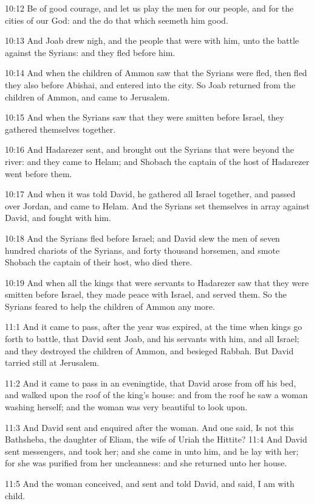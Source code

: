 10:12 Be of good courage, and let us play the men for our people, and
for the cities of our God: and the \LORD do that which seemeth him
good.

10:13 And Joab drew nigh, and the people that were with him, unto the
battle against the Syrians: and they fled before him.

10:14 And when the children of Ammon saw that the Syrians were fled,
then fled they also before Abishai, and entered into the city. So Joab
returned from the children of Ammon, and came to Jerusalem.

10:15 And when the Syrians saw that they were smitten before Israel,
they gathered themselves together.

10:16 And Hadarezer sent, and brought out the Syrians that were beyond
the river: and they came to Helam; and Shobach the captain of the host
of Hadarezer went before them.

10:17 And when it was told David, he gathered all Israel together, and
passed over Jordan, and came to Helam. And the Syrians set themselves
in array against David, and fought with him.

10:18 And the Syrians fled before Israel; and David slew the men of
seven hundred chariots of the Syrians, and forty thousand horsemen,
and smote Shobach the captain of their host, who died there.

10:19 And when all the kings that were servants to Hadarezer saw that
they were smitten before Israel, they made peace with Israel, and
served them. So the Syrians feared to help the children of Ammon any
more.

11:1 And it came to pass, after the year was expired, at the time when
kings go forth to battle, that David sent Joab, and his servants with
him, and all Israel; and they destroyed the children of Ammon, and
besieged Rabbah. But David tarried still at Jerusalem.

11:2 And it came to pass in an eveningtide, that David arose from off
his bed, and walked upon the roof of the king's house: and from the
roof he saw a woman washing herself; and the woman was very beautiful
to look upon.

11:3 And David sent and enquired after the woman. And one said, Is not
this Bathsheba, the daughter of Eliam, the wife of Uriah the Hittite?
11:4 And David sent messengers, and took her; and she came in unto
him, and he lay with her; for she was purified from her uncleanness:
and she returned unto her house.

11:5 And the woman conceived, and sent and told David, and said, I am
with child.

